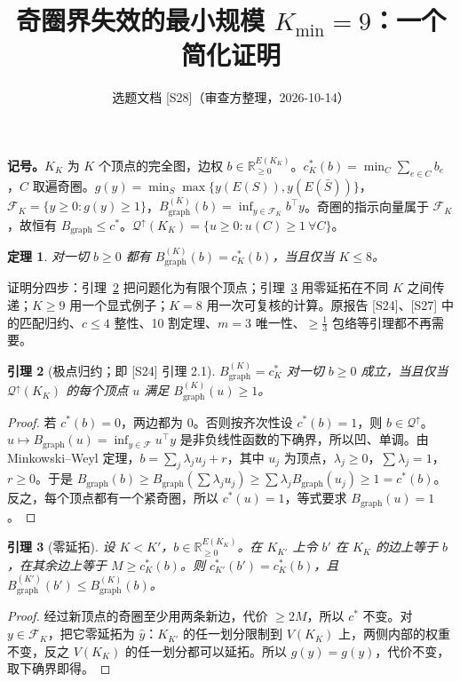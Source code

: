 \documentclass[11pt]{article}
\title{奇圈界失效的最小规模 $K_{\min}=9$：一个简化证明}
\author{选题文档 [S28]（审查方整理，2026-10-14）}
\date{}
\newtheorem{theorem}{定理}
\newtheorem{lemma}[theorem]{引理}
\theoremstyle{remark}
\newcommand{\Bg}{B_{\mathrm{graph}}}
\newcommand{\Q}{\mathcal Q^{\uparrow}}
\begin{document}
\sloppy
\maketitle

\noindent\textbf{记号。}$K_K$ 为 $K$ 个顶点的完全图，边权 $b\in\mathbb R_{\ge0}^{E(K_K)}$。$c^*_K(b)=\min_{C}\sum_{e\in C}b_e$，$C$ 取遍奇圈。$g(y)=\min_{S}\max\{y(E(S)),y(E(\bar S))\}$，$\mathcal F_K=\{y\ge0:g(y)\ge1\}$，$\Bg^{(K)}(b)=\inf_{y\in\mathcal F_K}b^\top y$。奇圈的指示向量属于 $\mathcal F_K$，故恒有 $\Bg\le c^*$。$\Q(K_K)=\{u\ge0:u(C)\ge1\ \forall C\}$。

\begin{theorem}
对一切 $b\ge0$ 都有 $\Bg^{(K)}(b)=c^*_K(b)$，当且仅当 $K\le 8$。
\end{theorem}

证明分四步：引理~\ref{lem:ext} 把问题化为有限个顶点；引理~\ref{lem:emb} 用零延拓在不同 $K$ 之间传递；$K\ge9$ 用一个显式例子；$K=8$ 用一次可复核的计算。原报告 [S24]、[S27] 中的匹配归约、$c\le4$ 整性、10 割定理、$m=3$ 唯一性、$\ge\tfrac13$ 包络等引理都不再需要。

\begin{lemma}[{极点归约；即 [S24] 引理 2.1}]\label{lem:ext}
$\Bg^{(K)}=c^*_K$ 对一切 $b\ge0$ 成立，当且仅当 $\Q(K_K)$ 的每个顶点 $u$ 满足 $\Bg^{(K)}(u)\ge1$。
\end{lemma}
\begin{proof}
若 $c^*(b)=0$，两边都为 $0$。否则按齐次性设 $c^*(b)=1$，则 $b\in\Q$。$u\mapsto\Bg(u)=\inf_{y\in\mathcal F}u^\top y$ 是非负线性函数的下确界，所以凹、单调。由 Minkowski--Weyl 定理，$b=\sum_j\lambda_ju_j+r$，其中 $u_j$ 为顶点，$\lambda_j\ge0$，$\sum\lambda_j=1$，$r\ge0$。于是 $\Bg(b)\ge\Bg(\sum\lambda_ju_j)\ge\sum\lambda_j\Bg(u_j)\ge1=c^*(b)$。反之，每个顶点都有一个紧奇圈，所以 $c^*(u)=1$，等式要求 $\Bg(u)=1$。
\end{proof}

\begin{lemma}[零延拓]\label{lem:emb}
设 $K<K'$，$b\in\mathbb R_{\ge0}^{E(K_K)}$。在 $K_{K'}$ 上令 $b'$ 在 $K_K$ 的边上等于 $b$，在其余边上等于 $M\ge c^*_K(b)$。则 $c^*_{K'}(b')=c^*_K(b)$，且 $\Bg^{(K')}(b')\le\Bg^{(K)}(b)$。
\end{lemma}
\begin{proof}
经过新顶点的奇圈至少用两条新边，代价 $\ge2M$，所以 $c^*$ 不变。对 $y\in\mathcal F_K$，把它零延拓为 $\hat y$：$K_{K'}$ 的任一划分限制到 $V(K_K)$ 上，两侧内部的权重不变，反之 $V(K_K)$ 的任一划分都可以延拓。所以 $g(\hat y)=g(y)$，代价不变，取下确界即得。
\end{proof}
\end{document}
